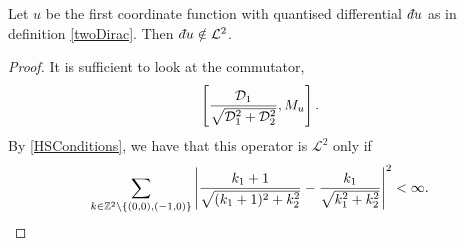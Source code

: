 \begin{proposition}
    Let $u$ be the first coordinate function with quantised differential
    $\qd u$ as in definition \ref{twoDirac}. Then $\qd u \notin \mathcal{L}^2$.
\end{proposition}
\begin{proof}
    It is sufficient to look at the commutator,
    \begin{equation}
        \left[\frac{\mathcal{D}_1}{\sqrt{\mathcal{D}_1^2+\mathcal{D}_2^2}},M_u\right].
    \end{equation}
    By \ref{HSConditions}, we have that this operator is $\mathcal{L}^2$
     only if
    \begin{equation}
        \sum_{k\in\mathbb{Z}^2\setminus \{(0,0),(-1,0)\}} \left|\frac{k_1+1}{\sqrt{(k_1+1)^2+k_2^2}}-\frac{k_1}{\sqrt{k_1^2+k_2^2}}\right|^2 < \infty.
    \end{equation}
    
\end{proof}



